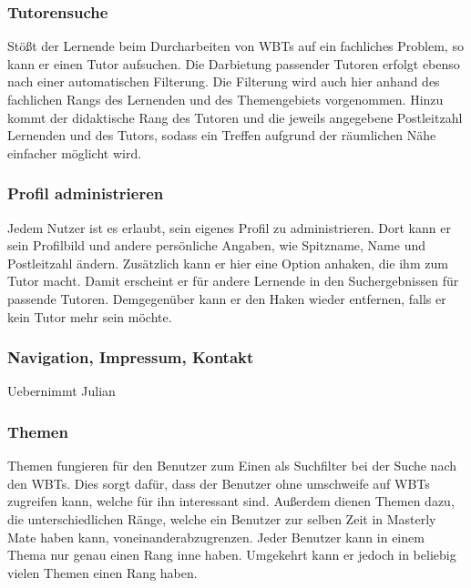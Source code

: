 \subsubsection{Tutorensuche}
Stößt der Lernende beim Durcharbeiten von WBTs auf ein fachliches Problem, so
kann er einen Tutor aufsuchen. Die Darbietung passender Tutoren erfolgt ebenso
nach einer automatischen Filterung. Die Filterung wird auch hier anhand des
fachlichen Rangs des Lernenden und des Themengebiets vorgenommen. Hinzu kommt
der didaktische Rang des Tutoren und die jeweils angegebene Postleitzahl
Lernenden und des Tutors, sodass ein Treffen aufgrund der räumlichen Nähe
einfacher möglicht wird.

\subsubsection{Profil administrieren}
Jedem Nutzer ist es erlaubt, sein eigenes Profil zu administrieren. Dort kann er
sein Profilbild und andere persönliche Angaben, wie Spitzname, Name und
Postleitzahl ändern. Zusätzlich kann er hier eine Option anhaken, die ihm zum
Tutor macht. Damit erscheint er für andere Lernende in den Suchergebnissen für
passende Tutoren. Demgegenüber kann er den Haken wieder entfernen, falls er kein
Tutor mehr sein möchte.

\subsubsection{Navigation, Impressum, Kontakt}
\begin{k}
Uebernimmt Julian
\end{k}

\subsubsection{Themen}
Themen fungieren für den Benutzer zum Einen als Suchfilter bei der Suche nach
den WBTs. Dies sorgt dafür, dass der Benutzer ohne umschweife auf WBTs zugreifen
kann, welche für ihn interessant sind. Außerdem dienen Themen dazu, die
unterschiedlichen Ränge, welche ein Benutzer zur selben Zeit in Masterly Mate
haben kann, voneinanderabzugrenzen. Jeder Benutzer kann in einem Thema nur genau
einen Rang inne haben. Umgekehrt kann er jedoch in beliebig vielen Themen einen
Rang haben.

